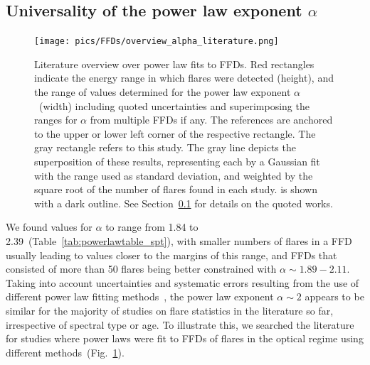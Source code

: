 \documentclass{aa}
\begin{document}
\subsection{Universality of the power law exponent $\alpha$}
\label{sec:sec:universal}
   \begin{figure}[t!]
   \centering
            \texttt{[image: pics/FFDs/overview\_alpha\_literature.png]}
         \caption{Literature overview over power law fits to FFDs. Red rectangles indicate the energy range in which flares were detected (height), and the range of values determined for the power law exponent $\alpha$~(width) including quoted uncertainties and superimposing the ranges for $\alpha$ from multiple FFDs if any. The references are anchored to the upper or lower left corner of the respective rectangle. The gray rectangle refers to this study. The gray line depicts the superposition of these results, representing each by a Gaussian fit with the range used as standard deviation, and weighted by the square root of the number of flares found in each study.  is shown with a dark outline. See Section~\ref{sec:sec:universal} for details on the quoted works.
}
          \label{fig:powerlaw_literature}
     
   \end{figure}
We found values for $\alpha$ to range from 1.84 to 2.39~(Table~\ref{tab:powerlawtable_spt}), with smaller numbers of flares in a FFD usually leading to values closer to the margins of this range, and FFDs that consisted of more than 50 flares being better constrained with $\alpha\sim 1.89-2.11$.
Taking into account uncertainties and systematic errors resulting from the use of different power law fitting methods~\citep{maschberger2009}, the power law exponent $\alpha\sim 2$ appears to be similar for the majority of studies on flare statistics in the literature so far, irrespective of spectral type or age. To illustrate this, we searched the literature for studies where power laws were fit to FFDs of flares in the optical regime using different methods~(Fig.~\ref{fig:powerlaw_literature}). 
\\
\end{document}
